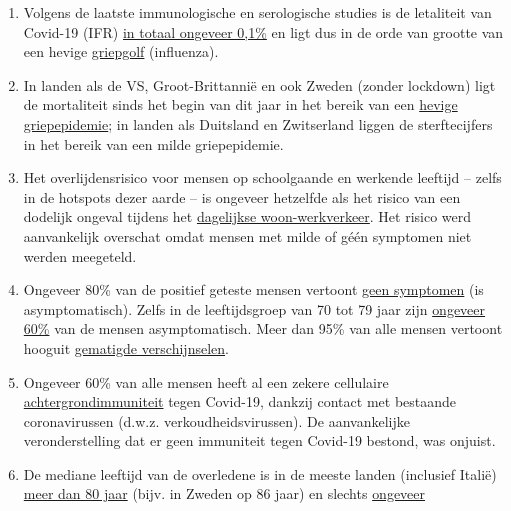 \begin{enumerate}
\def\labelenumi{\arabic{enumi}.}
\tightlist
\item
  Volgens de laatste immunologische en serologische studies is de
  letaliteit van Covid-19 (IFR)
  \href{https://swprs.org/studies-on-covid-19-lethality/}{in totaal
  ongeveer 0,1\%} en ligt dus in de orde van grootte van een hevige
  \href{https://www.ebm-netzwerk.de/en/publications/covid-19}{griepgolf}
  (influenza).
\item
  In landen als de VS, Groot-Brittannië en ook Zweden (zonder lockdown)
  ligt de mortaliteit sinds het begin van dit jaar in het bereik van een
  \href{https://swprs.org/studies-on-covid-19-lethality/\#overall-mortality}{hevige
  griepepidemie}; in landen als Duitsland en Zwitserland liggen de
  sterftecijfers in het bereik van een milde griepepidemie.
\item
  Het overlijdensrisico voor mensen op schoolgaande en werkende leeftijd
  -- zelfs in de hotspots dezer aarde -- is ongeveer hetzelfde als het
  risico van een dodelijk ongeval tijdens het
  \href{https://www.medrxiv.org/content/10.1101/2020.04.05.20054361v1}{dagelijkse
  woon-werkverkeer}. Het risico werd aanvankelijk overschat omdat mensen
  met milde of géén symptomen niet werden meegeteld.
\item
  Ongeveer 80\% van de positief geteste mensen vertoont
  \href{https://www.bmj.com/content/369/bmj.m1375}{geen symptomen} (is
  asymptomatisch). Zelfs in de leeftijdsgroep van 70 tot 79 jaar zijn
  \href{https://www.niid.go.jp/niid/en/2019-ncov-e/9407-covid-dp-fe-01.html}{ongeveer
  60\%} van de mensen asymptomatisch. Meer dan 95\% van alle mensen
  vertoont hooguit
  \href{https://swprs.org/studies-on-covid-19-lethality/\#hospitalizations}{gematigde
  verschijnselen}.
\item
  Ongeveer 60\% van alle mensen heeft al een zekere cellulaire
  \href{https://www.cell.com/cell/fulltext/S0092-8674(20)30610-3}{achtergrondimmuniteit}
  tegen Covid-19, dankzij contact met bestaande coronavirussen (d.w.z.
  verkoudheidsvirussen). De aanvankelijke veronderstelling dat er geen
  immuniteit tegen Covid-19 bestond, was onjuist.
\item
  De mediane leeftijd van de overledene is in de meeste landen
  (inclusief Italië)
  \href{https://swprs.org/studies-on-covid-19-lethality/\#age}{meer dan
  80 jaar} (bijv. in Zweden op 86 jaar) en slechts
  \href{https://www.bloomberg.com/news/articles/2020-05-26/italy-says-96-of-virus-fatalities-suffered-from-other-illnesses}{ongeveer
}
\end{enumerate}
